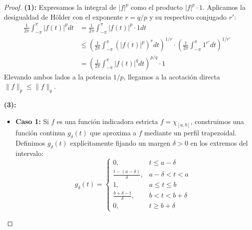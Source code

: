 \begin{proof}
\textbf{(1):} Expresamos la integral de $|f|^p$ como el producto $|f|^p \cdot 1$. Aplicamos la desigualdad de Hölder con el exponente $r = q/p$ y su respectivo conjugado $r'$:
\begin{align*}
    \frac{1}{2\pi} \int_{-\pi}^{\pi} |f(t)|^p dt &= \frac{1}{2\pi} \int_{-\pi}^{\pi} |f(t)|^p \cdot 1 dt \\
    &\le \left( \frac{1}{2\pi} \int_{-\pi}^{\pi} \left(|f(t)|^p\right)^r dt \right)^{1/r} \cdot \left( \frac{1}{2\pi} \int_{-\pi}^{\pi} 1^{r'} dt \right)^{1/r'} \\
    &= \left( \frac{1}{2\pi} \int_{-\pi}^{\pi} |f(t)|^q dt \right)^{p/q} \cdot 1
\end{align*}
Elevando ambos lados a la potencia $1/p$, llegamos a la acotación directa $\|f\|_p \le \|f\|_q$.

\medskip
\textbf{(3):}
\begin{itemize}
    \item \textbf{Caso 1:} Si $f$ es una función indicadora estricta $f = \chi_{[a,b]}$, construimos una función continua $g_\delta(t)$ que aproxima a $f$ mediante un perfil trapezoidal. Definimos $g_\delta(t)$ explícitamente fijando un margen $\delta > 0$ en los extremos del intervalo:
    \begin{equation*}
        g_\delta(t) = \begin{cases} 
        0, & t \le a-\delta \\
        \frac{t - (a-\delta)}{\delta}, & a-\delta < t < a \\
        1, & a \le t \le b \\
        \frac{b+\delta - t}{\delta}, & b < t < b+\delta \\
        0, & t \ge b+\delta 
        \end{cases}
    \end{equation*}
    

\end{itemize}
\end{proof}

